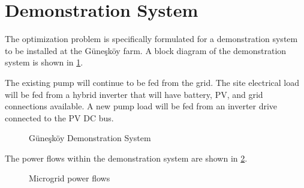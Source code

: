 \section{Demonstration System}
\label{sec:demo-system}

The optimization problem is specifically formulated for a demonstration system to be installed at the Güneşköy farm\cite{Guneskoy}. A block diagram of the demonstration system is shown in \cref{fig:demo-system}.

The existing pump will continue to be fed from the grid. The site electrical load will be fed from a hybrid inverter\cite{INVT_manual} that will have battery, PV, and grid connections available. A new pump load will be fed from an inverter drive\cite{Growatt_manual} connected to the PV DC bus.

\begin{figure}[t]
	\centering
	\fontsize{6.7pt}{9pt}\selectfont
	\def\svgwidth{0.8\columnwidth}
	
	\caption{Güneşköy Demonstration System}
	\label{fig:demo-system}
\end{figure}

The power flows within the demonstration system are shown in \cref{fig:power-flows}.

\begin{figure}[t]
	\centering
	
	\caption{Microgrid power flows}
	\label{fig:power-flows}
\end{figure}





